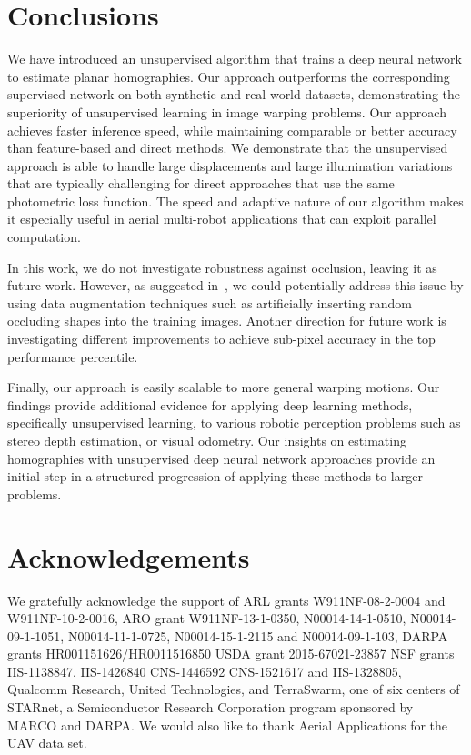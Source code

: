 \documentclass[letterpaper, 10 pt, conference]{ieeeconf}
\begin{document}
 \section{Conclusions}
We have introduced an unsupervised algorithm that trains a deep neural network to estimate planar homographies. Our approach outperforms the corresponding supervised network on both synthetic and real-world datasets, demonstrating the superiority of unsupervised learning in image warping problems. Our approach achieves faster inference speed, while maintaining comparable or better accuracy than feature-based and direct methods. We demonstrate that the unsupervised approach is able to handle large displacements and large illumination variations that are typically challenging for direct approaches that use the same photometric loss function. The speed and adaptive nature of our algorithm makes it especially useful in aerial multi-robot applications that can exploit parallel computation.

In this work, we do not investigate robustness against occlusion, leaving it as future work. However, as suggested in~\cite{detone2016}, we could potentially address this issue by using data augmentation techniques such as artificially inserting random occluding shapes into the training images. Another direction for future work is investigating different improvements to achieve sub-pixel accuracy in the top  performance percentile. 

Finally, our approach is easily scalable to more general warping motions. Our findings provide additional evidence for applying deep learning methods, specifically unsupervised learning, to various robotic perception problems such as stereo depth estimation, or visual odometry. Our insights on estimating homographies with unsupervised deep neural network approaches provide an initial step in a structured progression of applying these methods to larger problems. 


\section{Acknowledgements}
We gratefully acknowledge the support of
ARL grants  W911NF-08-2-0004 and W911NF-10-2-0016, ARO grant W911NF-13-1-0350, N00014-14-1-0510, N00014-09-1-1051, N00014-11-1-0725, N00014-15-1-2115 and N00014-09-1-103, DARPA grants HR001151626/HR0011516850 USDA grant 2015-67021-23857 NSF grants IIS-1138847, IIS-1426840 CNS-1446592 CNS-1521617 and   IIS-1328805, Qualcomm Research,
United Technologies,
and TerraSwarm, one of six centers of STARnet, a Semiconductor Research Corporation program sponsored by MARCO and DARPA. We would also like to thank Aerial Applications for the UAV data set. 

\end{document}
